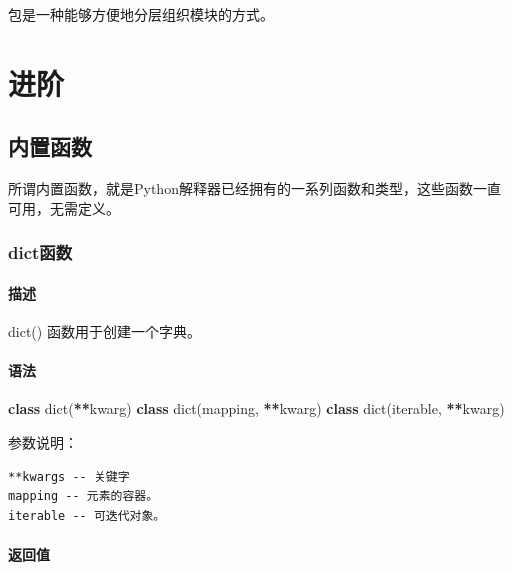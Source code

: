 \documentclass[]{ctexbook}
\newenvironment{Shaded}{\begin{snugshade}}{\end{snugshade}}
\newcommand{\BuiltInTok}[1]{#1}
\newcommand{\KeywordTok}[1]{\textcolor[rgb]{0.13,0.29,0.53}{\textbf{#1}}}
\newcommand{\NormalTok}[1]{#1}
\newcommand{\OperatorTok}[1]{\textcolor[rgb]{0.81,0.36,0.00}{\textbf{#1}}}
\begin{document}
包是一种能够方便地分层组织模块的方式。

\hypertarget{part-ux8fdbux9636}{%
\part{进阶}\label{part-ux8fdbux9636}}

\hypertarget{buildinfunctions}{%
\chapter{内置函数}\label{buildinfunctions}}

所谓内置函数，就是Python解释器已经拥有的一系列函数和类型，这些函数一直可用，无需定义。

\hypertarget{dictux51fdux6570}{%
\section{dict函数}\label{dictux51fdux6570}}

\hypertarget{ux63cfux8ff0}{%
\subsection{描述}\label{ux63cfux8ff0}}

dict() 函数用于创建一个字典。

\hypertarget{ux8bedux6cd5}{%
\subsection{语法}\label{ux8bedux6cd5}}

\begin{Shaded}
\begin{Highlighting}[]
\KeywordTok{class} \BuiltInTok{dict}\NormalTok{(}\OperatorTok{**}\NormalTok{kwarg)}
\KeywordTok{class} \BuiltInTok{dict}\NormalTok{(mapping, }\OperatorTok{**}\NormalTok{kwarg)}
\KeywordTok{class} \BuiltInTok{dict}\NormalTok{(iterable, }\OperatorTok{**}\NormalTok{kwarg)}
\end{Highlighting}
\end{Shaded}

参数说明：

\begin{verbatim}
**kwargs -- 关键字
mapping -- 元素的容器。
iterable -- 可迭代对象。
\end{verbatim}

\hypertarget{ux8fd4ux56deux503c}{%
\subsection{返回值}\label{ux8fd4ux56deux503c}}
\end{document}
